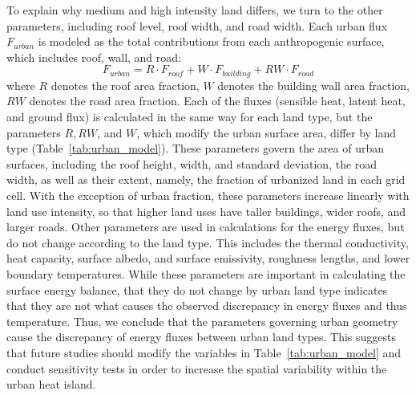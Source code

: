 To explain why medium and high intensity land differs, we turn to the other parameters, including roof level, roof width, and road width. 
Each urban flux $F_{urban}$ is modeled as the total contributions from each anthropogenic surface, which includes roof, wall, and road: 
\[ F_{urban} = R\cdot F_{roof} + W\cdot F_{building} + RW\cdot F_{road} \]
where $R$ denotes the roof area fraction, $W$ denotes the building wall area fraction, $RW$ denotes the road area fraction.
Each of the fluxes (sensible heat, latent heat, and ground flux) is calculated in the same way for each land type, but the parameters $R, RW$, and $W$, which modify the urban surface area, differ by land type (Table~\ref{tab:urban_model}). 
These parameters govern the area of urban surfaces, including the roof height, width, and standard deviation, the road width, as well as their extent, namely, the fraction of urbanized land in each grid cell. 
With the exception of urban fraction, these parameters increase linearly with land use intensity, so that higher land uses have taller buildings, wider roofs, and larger roads. 
Other parameters are used in calculations for the energy fluxes, but do not change according to the land type. This includes the thermal conductivity, heat capacity, surface albedo, and surface emissivity, roughness lengths, and lower boundary temperatures. While these parameters are important in calculating the surface energy balance, that they do not change by urban land type indicates that they are not what causes the observed discrepancy in energy fluxes and thus temperature. 
Thus, we conclude that the parameters governing urban geometry cause the discrepancy of energy fluxes between urban land types. 
This suggests that future studies should modify the variables in Table~\ref{tab:urban_model} and conduct sensitivity tests in order to increase the spatial variability within the urban heat island.
 
